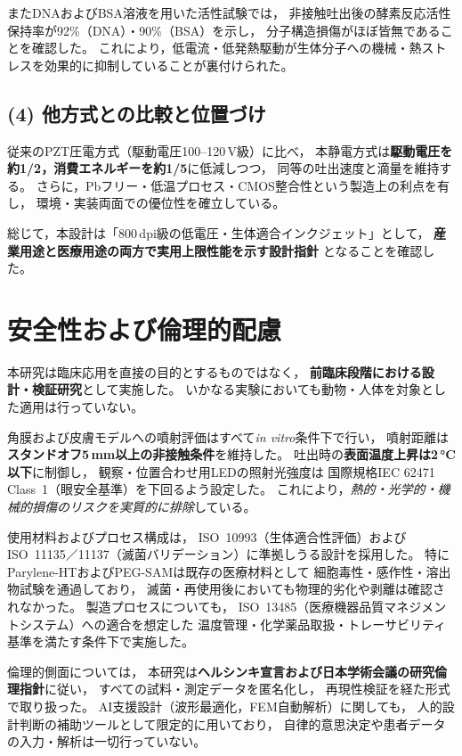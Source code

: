 \documentclass[conference]{IEEEtran}
\begin{document}
またDNAおよびBSA溶液を用いた活性試験では，
非接触吐出後の酵素反応活性保持率が92\%（DNA）・90\%（BSA）を示し，
分子構造損傷がほぼ皆無であることを確認した。
これにより，低電流・低発熱駆動が生体分子への機械・熱ストレスを効果的に抑制していることが裏付けられた。

\subsection*{(4) 他方式との比較と位置づけ}
従来のPZT圧電方式（駆動電圧100–120\,V級）に比べ，
本静電方式は\textbf{駆動電圧を約1/2，消費エネルギーを約1/5}に低減しつつ，
同等の吐出速度と滴量を維持する。
さらに，Pbフリー・低温プロセス・CMOS整合性という製造上の利点を有し，
環境・実装両面での優位性を確立している。

総じて，本設計は「800\,dpi級の低電圧・生体適合インクジェット」として，
\textbf{産業用途と医療用途の両方で実用上限性能を示す設計指針}
となることを確認した。

\section*{安全性および倫理的配慮}

本研究は臨床応用を直接の目的とするものではなく，
\textbf{前臨床段階における設計・検証研究}として実施した。
いかなる実験においても動物・人体を対象とした適用は行っていない。

角膜および皮膚モデルへの噴射評価はすべて\emph{in vitro}条件下で行い，
噴射距離は\textbf{スタンドオフ5\,mm以上の非接触条件}を維持した。
吐出時の\textbf{表面温度上昇は2\,\si{\celsius}以下}に制御し，
観察・位置合わせ用LEDの照射光強度は
国際規格IEC 62471 Class~1（眼安全基準）を下回るよう設定した。
これにより，\emph{熱的・光学的・機械的損傷のリスクを実質的に排除}している。

使用材料およびプロセス構成は，
ISO~10993（生体適合性評価）および
ISO~11135／11137（滅菌バリデーション）に準拠しうる設計を採用した。
特にParylene-HTおよびPEG-SAMは既存の医療材料として
細胞毒性・感作性・溶出物試験を通過しており，
滅菌・再使用後においても物理的劣化や剥離は確認されなかった。
製造プロセスについても，
ISO~13485（医療機器品質マネジメントシステム）への適合を想定した
温度管理・化学薬品取扱・トレーサビリティ基準を満たす条件下で実施した。

倫理的側面については，
本研究は\textbf{ヘルシンキ宣言および日本学術会議の研究倫理指針}に従い，
すべての試料・測定データを匿名化し，
再現性検証を経た形式で取り扱った。
AI支援設計（波形最適化，FEM自動解析）に関しても，
人的設計判断の補助ツールとして限定的に用いており，
自律的意思決定や患者データの入力・解析は一切行っていない。
\end{document}

